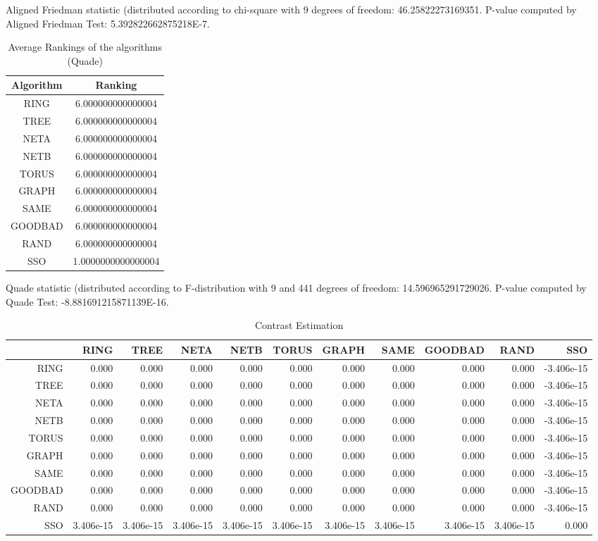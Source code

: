 \documentclass[a4paper,10pt]{article}
\begin{document}
\begin{landscape}
Aligned Friedman statistic (distributed according to chi-square with 9 degrees of freedom: 46.25822273169351. 
P-value computed by Aligned Friedman Test: 5.392822662875218E-7.\newline


\newpage

\begin{table}[!htp]
\centering
\caption{Average Rankings of the algorithms (Quade)
}\begin{tabular}{c|c}
Algorithm&Ranking\\
\hline
 RING&6.000000000000004\\
 TREE&6.000000000000004\\
 NETA&6.000000000000004\\
 NETB&6.000000000000004\\
 TORUS&6.000000000000004\\
 GRAPH&6.000000000000004\\
 SAME&6.000000000000004\\
 GOODBAD&6.000000000000004\\
 RAND&6.000000000000004\\
 SSO&1.0000000000000004\\
\end{tabular}
\end{table}
Quade statistic (distributed according to F-distribution with 9 and 441 degrees of freedom: 14.596965291729026. 
P-value computed by Quade Test: -8.881691215871139E-16.\newline


\newpage

\begin{table}[!htp]
\centering\tiny
\caption{Contrast Estimation}
\begin{tabular}{
|r|r|r|r|r|r|r|r|r|r|r|}
\hline
 & RING& TREE& NETA& NETB& TORUS& GRAPH& SAME& GOODBAD& RAND& SSO\\
\hline
 RING&0.000&0.000&0.000&0.000&0.000&0.000&0.000&0.000&0.000&-3.406e-15\\
\hline
 TREE&0.000&0.000&0.000&0.000&0.000&0.000&0.000&0.000&0.000&-3.406e-15\\
\hline
 NETA&0.000&0.000&0.000&0.000&0.000&0.000&0.000&0.000&0.000&-3.406e-15\\
\hline
 NETB&0.000&0.000&0.000&0.000&0.000&0.000&0.000&0.000&0.000&-3.406e-15\\
\hline
 TORUS&0.000&0.000&0.000&0.000&0.000&0.000&0.000&0.000&0.000&-3.406e-15\\
\hline
 GRAPH&0.000&0.000&0.000&0.000&0.000&0.000&0.000&0.000&0.000&-3.406e-15\\
\hline
 SAME&0.000&0.000&0.000&0.000&0.000&0.000&0.000&0.000&0.000&-3.406e-15\\
\hline
 GOODBAD&0.000&0.000&0.000&0.000&0.000&0.000&0.000&0.000&0.000&-3.406e-15\\
\hline
 RAND&0.000&0.000&0.000&0.000&0.000&0.000&0.000&0.000&0.000&-3.406e-15\\
\hline
 SSO&3.406e-15&3.406e-15&3.406e-15&3.406e-15&3.406e-15&3.406e-15&3.406e-15&3.406e-15&3.406e-15&0.000\\
\hline


\end{tabular}
\end{table}
\end{landscape}
\end{document}
